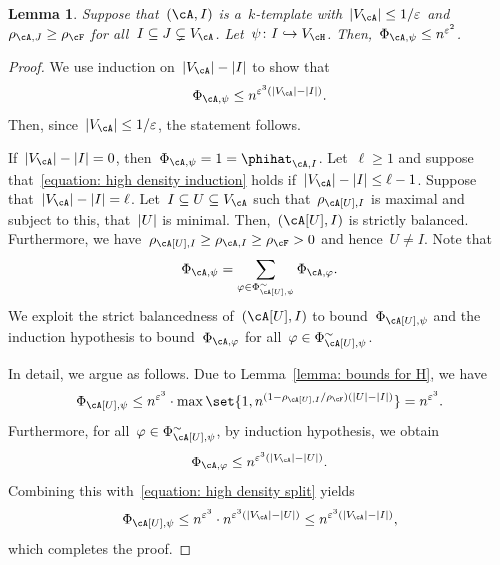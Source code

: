 \documentclass[11pt]{amsart}
\newcommand{\eps}{\varepsilon}
\DeclarePairedDelimiter{\abs}{\lvert}{\rvert}
\def\phi{\varphi}
\newcommand{\injection}{\hookrightarrow}
\newtheorem{lemma}[algocf]{Lemma}
\theoremstyle{definition}
\numberwithin{equation}{section}
\begin{document}
	\begin{lemma}\label{lemma: dense template chain}
		Suppose that~$(\cA,I)$ is a~$k$-template with~$\abs{V_\cA}\leq 1/\eps$ and~$\rho_{\cA,J}\geq \rho_\cF$ for all~$I\subseteq J\subsetneq V_\cA$.
		Let~$\psi\colon I\injection V_\cH$.
		Then,~$\Phi_{\cA,\psi}\leq n^{\eps^2}$.
	\end{lemma}
	\begin{proof}
		We use induction on~$\abs{V_\cA}-\abs{I}$ to show that
		\begin{equation}\label{equation: high density induction}
			\Phi_{\cA,\psi}\leq n^{\eps^{3}(\abs{V_\cA}-\abs{I})}.
		\end{equation}
		Then, since~$\abs{V_\cA}\leq 1/\eps$, the statement follows.
		
		If~$\abs{V_\cA}-\abs{I}=0$, then~$\Phi_{\cA,\psi}=1=\phihat_{\cA,I}$.
		Let~$\ell\geq 1$ and suppose that~\eqref{equation: high density induction} holds if~$\abs{V_\cA}-\abs{I}\leq\ell-1$.
		Suppose that~$\abs{V_\cA}-\abs{I}=\ell$.
		Let~$I\subseteq U\subseteq V_\cA$ such that~$\rho_{\cA[U],I}$ is maximal and subject to this, that~$\abs{U}$ is minimal.
		Then,~$(\cA[U],I)$ is strictly balanced.
		Furthermore, we have~$\rho_{\cA[U],I}\geq\rho_{\cA,I}\geq\rho_\cF>0$ and hence~$U\neq I$.
		Note that
		\begin{equation}\label{equation: high density split}
			\Phi_{\cA,\psi}=\sum_{\phi\in\Phi_{\cA[U],\psi}^\sim} \Phi_{\cA,\phi}.
		\end{equation}
		We exploit the strict balancedness of~$(\cA[U],I)$ to bound~$\Phi_{\cA[U],\psi}$ and the induction hypothesis to bound~$\Phi_{\cA,\phi}$ for all~$\phi\in\Phi_{\cA[U],\psi}^\sim$.
		
		In detail, we argue as follows.
		Due to Lemma~\ref{lemma: bounds for H}, we have
		\begin{equation*}
			\Phi_{\cA[U],\psi}
			\leq n^{\eps^3}\cdot\max\set{1,n^{(1-\rho_{\cA[U],I}/\rho_\cF)(\abs{U}-\abs{I})}}
			= n^{\eps^3}.
		\end{equation*}
		Furthermore, for all~$\phi\in\Phi_{\cA[U],\psi}^\sim$, by induction hypothesis, we obtain
		\begin{equation*}
			\Phi_{\cA,\phi}\leq n^{\eps^3(\abs{V_\cA}-\abs{U})}.
		\end{equation*}
		Combining this with~\eqref{equation: high density split} yields
		\begin{equation*}
			\Phi_{\cA[U],\psi}
			\leq n^{\eps^{3}}\cdot n^{\eps^{3}(\abs{V_\cA}-\abs{U})}
			\leq n^{\eps^{3}(\abs{V_\cA}-\abs{I})},
		\end{equation*}
		which completes the proof.
	\end{proof}
	
\end{document}
